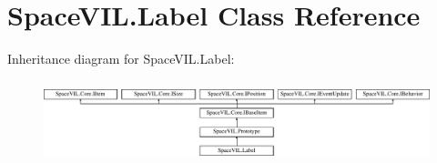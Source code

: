 \hypertarget{class_space_v_i_l_1_1_label}{}\section{Space\+V\+I\+L.\+Label Class Reference}
\label{class_space_v_i_l_1_1_label}
Inheritance diagram for Space\+V\+I\+L.\+Label\+:\begin{figure}[H]
\begin{center}
\leavevmode
\includegraphics[height=2.421622cm]{class_space_v_i_l_1_1_label}
\end{center}
\end{figure}

